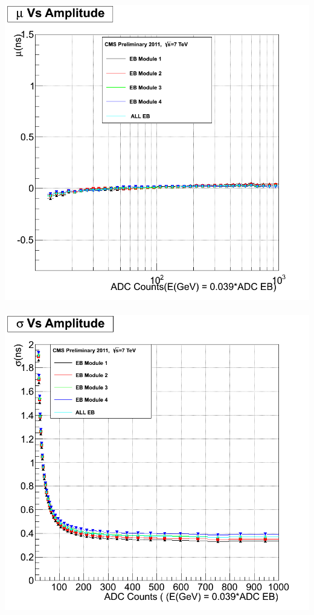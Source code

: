 \begin{center}
\centering
\mbox{\includegraphics[scale=0.25]{THESISPLOTS/EB_TimeVsAmplitude_StabilityCMSSW_5_3_X.png} \quad
\includegraphics[scale=0.25]{THESISPLOTS/EB_SigmaVsAmplitude_Stability_In_CMSSW_53X.png}}

\end{center}
